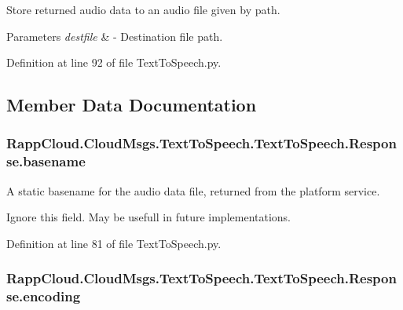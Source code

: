 Store returned audio data to an audio file given by path. 


\begin{DoxyParams}{Parameters}
{\em destfile} & -\/ Destination file path. \\
\hline
\end{DoxyParams}


Definition at line 92 of file Text\-To\-Speech.\-py.



\subsection{Member Data Documentation}
\hypertarget{classRappCloud_1_1CloudMsgs_1_1TextToSpeech_1_1TextToSpeech_1_1Response_ac0fac3eba876ff415ac7f8d48abfb91c}{
\subsubsection[{basename}]{\setlength{\rightskip}{0pt plus 5cm}Rapp\-Cloud.\-Cloud\-Msgs.\-Text\-To\-Speech.\-Text\-To\-Speech.\-Response.\-basename}}\label{classRappCloud_1_1CloudMsgs_1_1TextToSpeech_1_1TextToSpeech_1_1Response_ac0fac3eba876ff415ac7f8d48abfb91c}


A static basename for the audio data file, returned from the platform service. 

Ignore this field. May be usefull in future implementations. 

Definition at line 81 of file Text\-To\-Speech.\-py.

\hypertarget{classRappCloud_1_1CloudMsgs_1_1TextToSpeech_1_1TextToSpeech_1_1Response_a241dd8ebf6abe024e6b628755566585b}{
\subsubsection[{encoding}]{\setlength{\rightskip}{0pt plus 5cm}Rapp\-Cloud.\-Cloud\-Msgs.\-Text\-To\-Speech.\-Text\-To\-Speech.\-Response.\-encoding}}\label{classRappCloud_1_1CloudMsgs_1_1TextToSpeech_1_1TextToSpeech_1_1Response_a241dd8ebf6abe024e6b628755566585b}


